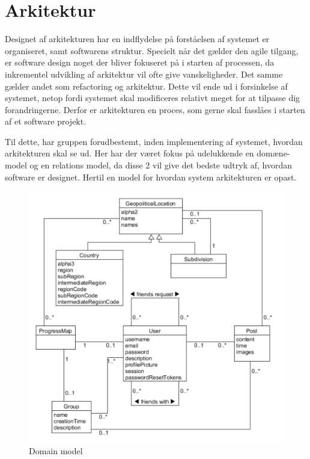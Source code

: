 \chapter{Arkitektur}\label{ch:Arkitektur}

Designet af arkitekturen har en indflydelse på forståelsen af systemet er organiseret, samt softwarens struktur. Specielt når det gælder den agile tilgang, er software design noget der bliver fokuseret på i starten af processen, da inkrementel udvikling af arkitektur vil ofte give vanskeligheder. Det samme gælder andet som refactoring og arkitektur. Dette vil ende ud i forsinkelse af systemet, netop fordi systemet skal modificeres relativt meget for at tilpasse dig forandringerne. Derfor er arkitekturen en proces, som gerne skal fasslåes i starten af et software projekt. \cite{Sommerville}

Til dette, har gruppen forudbestemt, inden implementering af systemet, hvordan arkitekturen skal se ud. Her har der været fokus på udelukkende en domæne-model og en relations model, da disse 2 vil give det bedste udtryk af, hvordan software er designet. Hertil en model for hvordan system arkitekturen er opast. 

\begin{figure}
    \includegraphics[width=\linewidth]{figures/Domain.png}
    \caption{Domain model}
    \label{fig:Domain}
\end{figure}



